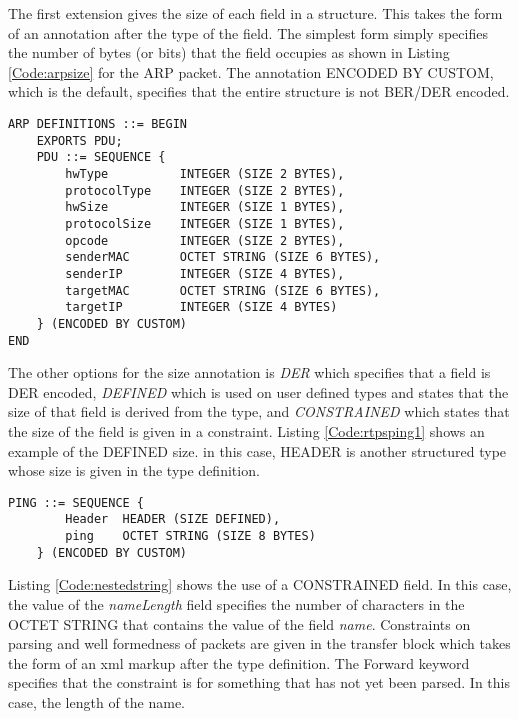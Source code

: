 \documentclass[12pt,oneside,letterpaper]{article}
\begin{document}
The first extension gives the size of each field in a structure. This takes the form of an annotation after the type of the field. The simplest form simply specifies the number of bytes (or bits) that the field occupies as shown in Listing \ref{Code:arpsize} for the ARP packet. The annotation ENCODED BY CUSTOM, which is the default, specifies that the entire structure is not BER/DER encoded.

\begin{lstlisting}[language=SCL2,style=mystyle,frame=none,
caption=Constant Field Sizes,label=Code:arpsize, xleftmargin=3.5ex]
ARP DEFINITIONS ::= BEGIN
    EXPORTS PDU;
    PDU ::= SEQUENCE {
        hwType          INTEGER (SIZE 2 BYTES),
        protocolType    INTEGER (SIZE 2 BYTES),
        hwSize          INTEGER (SIZE 1 BYTES),
        protocolSize    INTEGER (SIZE 1 BYTES),
        opcode          INTEGER (SIZE 2 BYTES),
        senderMAC       OCTET STRING (SIZE 6 BYTES),
        senderIP        INTEGER (SIZE 4 BYTES),
        targetMAC       OCTET STRING (SIZE 6 BYTES),
        targetIP        INTEGER (SIZE 4 BYTES)
    } (ENCODED BY CUSTOM)
END
\end{lstlisting}

The other options for the size annotation is \textit{DER} which specifies that a field is DER encoded, \textit{DEFINED} which is used on user defined types and states that the size of that field is derived from the type, and \textit{CONSTRAINED} which states that the size of the field is given in a constraint. Listing \ref{Code:rtpsping1} shows an example of the DEFINED size. in this case, HEADER is another structured type whose size is given in the type definition.

\begin{lstlisting}[language=SCL2,style=mystyle,frame=none,
caption=Fields with Defined Size,label=Code:rtpsping1, xleftmargin=3.5ex]
    PING ::= SEQUENCE {
        Header  HEADER (SIZE DEFINED),
        ping    OCTET STRING (SIZE 8 BYTES)
    } (ENCODED BY CUSTOM)
\end{lstlisting}

Listing \ref{Code:nestedstring} shows the use of a CONSTRAINED field. In this case, the value of the \textit{nameLength} field specifies the number of characters in the OCTET STRING that contains the value of the field \textit{name}. Constraints on parsing and well formedness of packets are given in the transfer block which takes the form of an xml markup after the type definition. The Forward keyword specifies that the constraint is for something that has not yet been parsed. In this case, the length of the name. 
\end{document}
